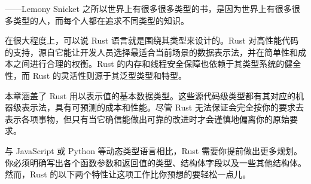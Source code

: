
\begin{myEpigraph}{——Lemony Snicket}
之所以世界上有很多很多类型的书，是因为世界上有很多很多类型的人，而每个人都在追求不同类型的知识。
\end{myEpigraph}

在很大程度上，可以说 Rust 语言就是围绕其类型来设计的。Rust 对高性能代码的支持，源自它能让开发人员选择最适合当前场景的数据表示法，并在简单性和成本之间进行合理的权衡。Rust 的内存和线程安全保障也依赖于其类型系统的健全性，而 Rust 的灵活性则源于其泛型类型和特型。

本章涵盖了 Rust 用以表示值的基本数据类型。这些源代码级类型都有其对应的机器级表示法，具有可预测的成本和性能。尽管 Rust 无法保证会完全按你的要求去表示各项事物，但只有当它确信能做出可靠的改进时才会谨慎地偏离你的原始要求。

与 JavaScript 或 Python 等动态类型语言相比，Rust 需要你提前做出更多规划。你必须明确写出各个函数参数和返回值的类型、结构体字段以及一些其他结构体。然而，Rust 的以下两个特性让这项工作比你预想的要轻松一点儿。

